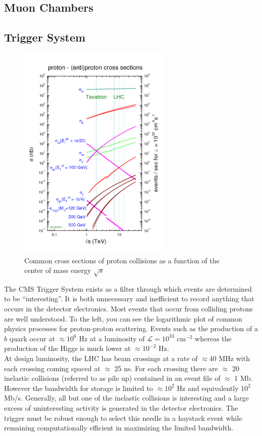 \subsection{Muon Chambers}

\subsection{Trigger System}

\begin{figure}
\begin{center}
\includegraphics[width=2.9in]{figures/exp_proj/pdf_xsec.png}
\caption{Common cross sections of proton collisions as a function of the center of mass energy $\sqrt{s}$}
\end{center}
\label{fig:pdf_xsec}
\end{figure}

The CMS Trigger System exists as a filter through which events are determined to be ``interesting''. 
It is both  unnecessary and inefficient to record anything that occurs in the detector electronics. 
Most events that occur from colliding protons are well understood. To the left, you can see the 
logarithmic plot of common physics processes for proton-proton scattering. Events such as the production 
of a $b$ quark  occur at $\approx 10^6$ Hz at a luminosity of $\mathcal{L} = 10^{33}$ cm$^{-2}$ 
whereas the production of the Higgs is much lower at $\approx 10^{-2}$ Hz.  \\

At design luminosity, the LHC has beam crossings at a rate of $\approx 40$ MHz with 
each crossing coming spaced at $\approx$ 25 ns. 
For each crossing there are $\approx$ 20 inelastic collisions (referred to as pile up) 
contained in an event file of $\approx$ 1 Mb. 
However the bandwidth for storage is limited to $\approx 10^2$ Hz and equivalently $10^2$ Mb/s. 
Generally, all but one of the inelastic collisions is interesting and a large excess of uninteresting 
activity is generated in the detector electronics. The trigger must be robust enough to select 
this needle in a haystack event while remaining computationally efficient in maximizing the limited bandwidth.  \\

